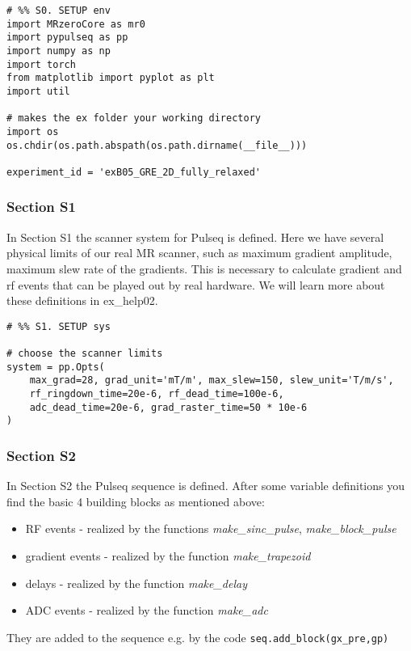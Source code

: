 \documentclass[a4paper,12pt]{extarticle}
\begin{document}
\begin{verbatim}
# %% S0. SETUP env
import MRzeroCore as mr0
import pypulseq as pp
import numpy as np
import torch
from matplotlib import pyplot as plt
import util

# makes the ex folder your working directory
import os
os.chdir(os.path.abspath(os.path.dirname(__file__)))

experiment_id = 'exB05_GRE_2D_fully_relaxed'
\end{verbatim}

\subsubsection{Section S1}
In Section S1 the scanner system for Pulseq is defined.
Here we have several physical limits of our real MR scanner, such as maximum gradient amplitude, maximum slew rate of the gradients. This is necessary to calculate gradient and rf events that can be played out by real hardware. We will learn more about these definitions in ex\_help02.

\begin{verbatim}
# %% S1. SETUP sys

# choose the scanner limits
system = pp.Opts(
    max_grad=28, grad_unit='mT/m', max_slew=150, slew_unit='T/m/s',
    rf_ringdown_time=20e-6, rf_dead_time=100e-6,
    adc_dead_time=20e-6, grad_raster_time=50 * 10e-6
)

\end{verbatim}

\subsubsection{Section S2}
In Section S2 the Pulseq sequence is defined. After some variable definitions you find the basic 4 building blocks as mentioned above:
\begin{itemize}
\item RF events - realized by the functions \emph{make\_sinc\_pulse}, \emph{make\_block\_pulse}
\item gradient events - realized by the function \emph{make\_trapezoid}
\item delays - realized by the function \emph{make\_delay}
\item ADC events  - realized by the function \emph{make\_adc}
\end{itemize}

They are added to the sequence e.g. by the code \texttt{seq.add_block(gx_pre,gp)}
\end{document}
